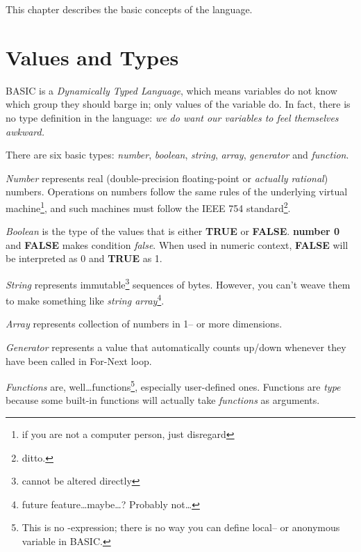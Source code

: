 This chapter describes the basic concepts of the language.


\section{Values and Types}
\label{valuesandtypes}

BASIC is a \emph{Dynamically Typed Language}, which means variables do not know which group they should barge in; only values of the variable do. In fact, there is no type definition in the language: \emph{we do want our variables to feel themselves awkward.}

There are six basic types: \emph{number}, \emph{boolean}, \emph{string},  \emph{array}, \emph{generator} and \emph{function}.

\emph{Number} represents real (double-precision floating-point or \emph{actually rational}) numbers. Operations on numbers follow the same rules of the underlying virtual machine\footnote{if you are not a computer person, just disregard}, and such machines must follow the IEEE 754 standard\footnote{ditto.}. 

\emph{Boolean} is the type of the values that is either \textbf{TRUE} or \textbf{FALSE}. \textbf{number 0} and \textbf{FALSE} makes condition \emph{false}. When used in numeric context, \textbf{FALSE} will be interpreted as 0 and \textbf{TRUE} as 1.

\emph{String} represents immutable\footnote{cannot be altered directly} sequences of bytes. However, you can't weave them to make something like \emph{string array}\footnote{future feature\ldots maybe\ldots? Probably not\ldots}.

\emph{Array} represents collection of numbers in 1-- or more dimensions.

\emph{Generator} represents a value that automatically counts up/down whenever they have been called in For-Next loop.

\emph{Functions} are, well\ldots functions\footnote{This is no {\lambda}-expression; there is no way you can define local-- or anonymous variable in BASIC.}, especially user-defined ones. Functions are \emph{type} because some built-in functions will actually take \emph{functions} as arguments.

